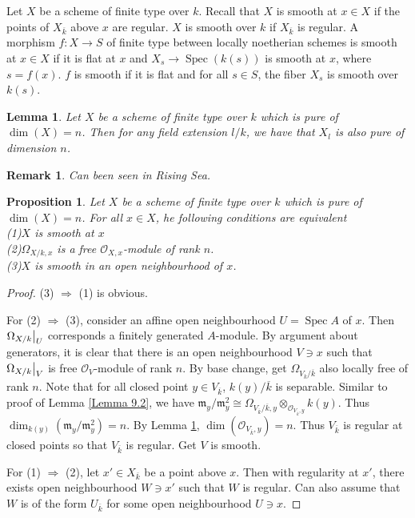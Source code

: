 \documentclass{ctexart}
\newtheorem{remark}{Remark}[section]
\newtheorem{proposition}{Proposition}[section]
\newtheorem{lemma}{Lemma}[section]
\newcommand{\spec}{\operatorname{Spec}}
\begin{document}
Let $X$ be a scheme of finite type over $k$.
Recall that $X$ is smooth at $x\in X$ if the points of $X_{\overline{k}}$ above $x$ are regular.
$X$ is smooth over $k$ if $X_{\overline{k}}$ is regular.
A morphism $f: X \longrightarrow S$ of finite type between locally noetherian schemes is smooth at $x\in X$ if it is flat at $x$ and $X_{s} \longrightarrow \spec(k(s))$ is smooth at $x$,
where $s = f(x)$.
$f$ is smooth if it is flat and for all $s\in S$, the fiber $X_{s}$ is smooth over $k(s)$.
\begin{lemma}
    Let $X$ be a scheme of finite type over $k$ which is pure of $\dim(X) = n$.
    Then for any field extension $l/k$, we have that $X_{l}$ is also pure of dimension $n$.
    \label{Lemma 9.3}
\end{lemma}
\begin{remark}
    Can been seen in Rising Sea.
\end{remark}
\begin{proposition}
    Let $X$ be a scheme of finite type over $k$ which is pure of $\dim(X) = n$.
    For all $x\in X$, he following conditions are equivalent \\
    (1)$X$ is smooth at $x$ \\
    (2)$\Omega_{X/k, x}$ is a free $\mathcal{O}_{X, x}$-module of rank $n$. \\
    (3)$X$ is smooth in an open neighbourhood of $x$.
    \label{Proposition 9.6}
\end{proposition}
\begin{proof}
    (3) $\Rightarrow$ (1) is obvious.
    \par
    For (2) $\Rightarrow$ (3), consider an affine open neighbourhood $U = \spec A$ of $x$.
    Then $\Omega_{X/k}\big{|}_{U}$ corresponds a finitely generated $A$-module.
    By argument about generators, it is clear that there is an open neighbourhood $V\ni x$ such that $\Omega_{X/k}\big{|}_{V}$ is free $\mathcal{O}_{V}$-module of rank $n$.
    By base change, get $\Omega_{V_{\overline{k}}/\overline{k}}$ also locally free of rank $n$.
    Note that for all closed point $y\in V_{\overline{k}}$, $k(y)/\overline{k}$ is separable.
    Similar to proof of Lemma \ref{Lemma 9.2}, we have $\mathfrak{m}_{y}/\mathfrak{m}_{y}^{2} \cong \Omega_{V_{\overline{k}}/\overline{k}, y} \otimes_{\mathcal{O}_{V_{\overline{k}}, y}} k(y)$.
    Thus $\dim_{k(y)}(\mathfrak{m}_{y}/\mathfrak{m}_{y}^{2}) = n$.
    By Lemma \ref{Lemma 9.3}, $\dim(\mathcal{O}_{V_{\overline{k}}, y}) = n$.
    Thus $V_{\overline{k}}$ is regular at closed points so that $V_{\overline{k}}$ is regular.
    Get $V$ is smooth.
    \par
    For (1) $\Rightarrow$ (2), let $x'\in X_{\overline{k}}$ be a point above $x$.
    Then with regularity at $x'$, there exists open neighbourhood $W\ni x'$ such that $W$ is regular.
    Can also assume that $W$ is of the form $U_{\overline{k}}$ for some open neighbourhood $U\ni x$.
\end{proof}
\end{document}
